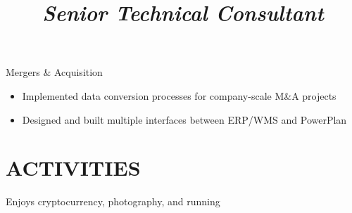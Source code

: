 \documentclass[margin,11pt]{res}
\begin{document}
\begin{resume}
\vspace{\baselineskip}

\title{\sl{Senior Technical Consultant}}
\begin{position}
Mergers \& Acquisition\\
\begin{itemize}
\item Implemented data conversion processes for company-scale M\&A projects
\item Designed and built multiple interfaces between ERP/WMS and PowerPlan
\end{itemize}
\end{position}

\section{ACTIVITIES}
Enjoys cryptocurrency, photography, and running

\end{resume}
\end{document}
